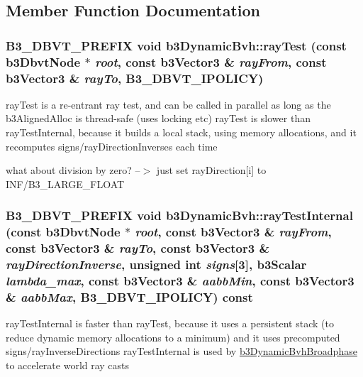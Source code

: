 \subsection{Member Function Documentation}
\hypertarget{structb3_dynamic_bvh_b913761020aef36751217a877fcf7e6d}{
\subsubsection[rayTest]{\setlength{\rightskip}{0pt plus 5cm}B3\_\-DBVT\_\-PREFIX void b3DynamicBvh::rayTest (const b3DbvtNode $\ast$ {\em root}, \/  const b3Vector3 \& {\em rayFrom}, \/  const b3Vector3 \& {\em rayTo}, \/  B3\_\-DBVT\_\-IPOLICY)}}
\label{structb3_dynamic_bvh_b913761020aef36751217a877fcf7e6d}


rayTest is a re-entrant ray test, and can be called in parallel as long as the b3AlignedAlloc is thread-safe (uses locking etc) rayTest is slower than rayTestInternal, because it builds a local stack, using memory allocations, and it recomputes signs/rayDirectionInverses each time 

what about division by zero? --$>$ just set rayDirection\mbox{[}i\mbox{]} to INF/B3\_\-LARGE\_\-FLOAT \hypertarget{structb3_dynamic_bvh_164303efd5eac767e608b09526734b59}{
\subsubsection[rayTestInternal]{\setlength{\rightskip}{0pt plus 5cm}B3\_\-DBVT\_\-PREFIX void b3DynamicBvh::rayTestInternal (const b3DbvtNode $\ast$ {\em root}, \/  const b3Vector3 \& {\em rayFrom}, \/  const b3Vector3 \& {\em rayTo}, \/  const b3Vector3 \& {\em rayDirectionInverse}, \/  unsigned int {\em signs}\mbox{[}3\mbox{]}, \/  b3Scalar {\em lambda\_\-max}, \/  const b3Vector3 \& {\em aabbMin}, \/  const b3Vector3 \& {\em aabbMax}, \/  B3\_\-DBVT\_\-IPOLICY) const}}
\label{structb3_dynamic_bvh_164303efd5eac767e608b09526734b59}


rayTestInternal is faster than rayTest, because it uses a persistent stack (to reduce dynamic memory allocations to a minimum) and it uses precomputed signs/rayInverseDirections rayTestInternal is used by \hyperlink{structb3_dynamic_bvh_broadphase}{b3DynamicBvhBroadphase} to accelerate world ray casts 

